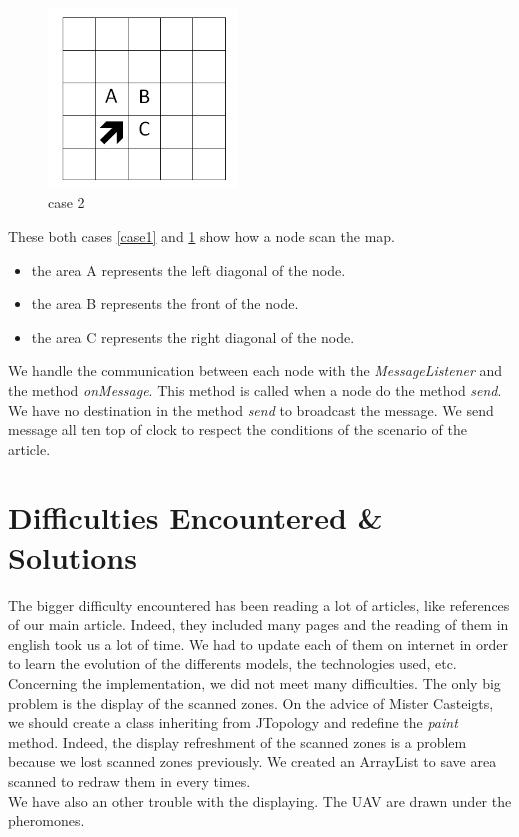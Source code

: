 \begin{figure}[!h]
\center
\includegraphics[width=5cm]{../images/grille_case_2.png}
\caption{\label{case2}case 2}
\end{figure}

These both cases \ref{case1} and \ref{case2} show how a node scan the map.

\begin{itemize}
\item the area A represents the left diagonal of the node.
\item the area B represents the front of the node.
\item the area C represents the right diagonal of the node.
\end{itemize}

We handle the communication between each node with the \textit{MessageListener} and the method \textit{onMessage}. This method is called when a node do the method \textit{send}. We have no destination in the method \textit{send} to broadcast the message. We send message all ten top of clock to respect the conditions of the scenario of the article.

\section{Difficulties Encountered \& Solutions}

The bigger difficulty encountered has been reading a lot of articles, like references of our main article. Indeed, they included many pages and the reading of them in english took us a lot of time. We had to update each of them on internet in order to learn the evolution of the differents models, the technologies used, etc.\\

Concerning the implementation, we did not meet many difficulties. The only big problem is the display of the scanned zones. On the advice of Mister Casteigts, we should create a class inheriting from JTopology and redefine the \textit{paint} method. Indeed, the display refreshment of the scanned zones is a problem because we lost scanned zones previously. We created an ArrayList to save area scanned to redraw them in every times.\\

We have also an other trouble with the displaying. The UAV are drawn under the pheromones.